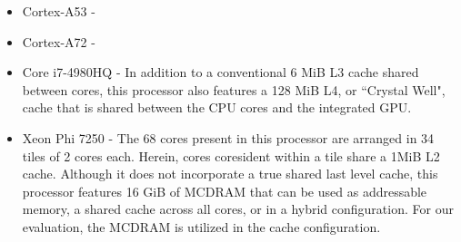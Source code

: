 \begin{itemize}
\item Cortex-A53 -
\newline
\item Cortex-A72 -
\newline
\item Core i7-4980HQ - In addition to a conventional 6 MiB L3 cache shared between cores, this processor also features a 128 MiB L4, or ``Crystal Well", cache that is shared between the CPU cores and the integrated GPU.
\newline
\item Xeon Phi 7250 - The 68 cores present in this processor are arranged in 34 tiles of 2 cores each.
Herein, cores coresident within a tile share a 1MiB L2 cache.
Although it does not incorporate a true shared last level cache, this processor features 16 GiB of MCDRAM that can be used as addressable memory, a shared cache across all cores, or in a hybrid configuration. 
For our evaluation, the MCDRAM is utilized in the cache configuration.
\end{itemize}


